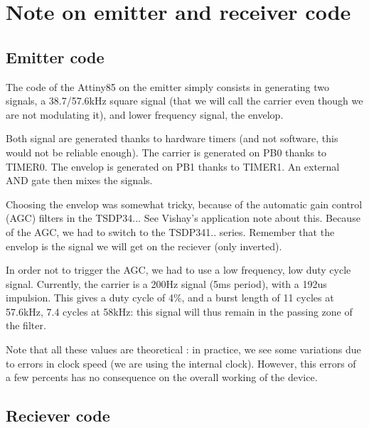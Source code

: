 \documentclass[a4paper,11pt]{article}
\begin{document}
\section{Note on emitter and receiver code}

\subsection{Emitter code}
\indent \par The code of the Attiny85 on the emitter simply consists in generating two signals, a 38.7/57.6kHz square signal (that we will call the carrier even though we are not modulating it), and lower frequency signal, the envelop.
\par Both signal are generated thanks to hardware timers (and not software, this would not be reliable enough). The carrier is generated on PB0 thanks to TIMER0. The envelop is generated on PB1 thanks to TIMER1. An external AND gate then mixes the signals.
\par Choosing the envelop was somewhat tricky, because of the automatic gain control (AGC) filters in the TSDP34... See Vishay's application note about this. Because of the AGC, we had to switch to the TSDP341.. series. Remember that the envelop is the signal we will get on the reciever (only inverted).
\par In order not to trigger the AGC, we had to use a low frequency, low duty cycle signal. Currently, the carrier is a 200Hz signal (5ms period), with a 192us impulsion. This gives a duty cycle of 4\%, and a burst length of 11 cycles at 57.6kHz, 7.4 cycles at 58kHz: this signal will thus remain in the passing zone of the filter.
\par Note that all these values are theoretical : in practice, we see some variations due to errors in clock speed (we are using the internal clock). However, this errors of a few percents has no consequence on the overall working of the device.

\subsection{Reciever code}
\end{document}
